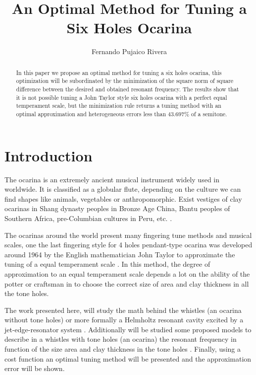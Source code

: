 \documentclass[11pt,twocolumn]{article}
\title{ An Optimal Method for Tuning a Six Holes Ocarina }
\author{Fernando Pujaico Rivera}
\date{ }
\begin{document}
\maketitle


\begin{abstract}
In this paper we propose an optimal method for tuning a six holes ocarina,
this optimization will be subordinated by the minimization of 
the square norm of square difference between the desired and obtained resonant frequency.
The results show that it is not possible tuning a John Taylor style six holes ocarina with a perfect equal temperament scale,
but the minimization rule returns a tuning method with an optimal approximation and heterogeneous errors less than $43.697\%$ of a semitone.
\end{abstract}



\section{Introduction}
The ocarina is an extremely ancient musical instrument widely used in worldwide. 
It is classified as a globular flute,
depending on the culture we can find shapes like animals, vegetables or anthropomorphic.
Exist vestiges of clay ocarinas in 
Shang dynasty peoples in Bronze Age China, 
Bantu peoples of Southern Africa,
pre-Columbian cultures in Peru, etc.
\cite[pp. 589]{apel1969harvard} \cite{sachs1940history} \cite[pp. 31]{leinweber2020art} \cite{rossi2020recuperacion}.

The ocarinas around the world present many fingering tune methods and musical scales,
one the last fingering style for 4 holes pendant-type ocarina was developed around 1964 
by the English mathematician John Taylor 
to approximate the tuning of a equal temperament scale 
\cite[pp. 79]{metropolitan1985american} \cite[pp. 10]{galpin2001newsletter}.
In this method, 
the degree of approximation to an equal temperament scale depends a lot on the ability of the potter or craftsman
in to choose the correct size of area and clay thickness in all the tone holes.

The work presented here, will study the math behind the whistles (an ocarina without tone holes)  
or more formally a Helmholtz resonant cavity \cite{corning2011resonance} excited by a jet-edge-resonator system \cite[pp. 3]{gibiat2013acoustic} \cite[pp. 138]{nyborg1953characteristics}. 
Additionally will be studied some proposed models to describe 
in a whistles with tone holes (an ocarina)
the resonant frequency in function of the size area and  clay thickness in the tone holes 
\cite{mp2010ocarina} \cite[pp. 44]{cabreraestudio} \cite{1999air}.
Finally, using a cost function an optimal tuning method will be presented 
and the approximation error will be shown. 
\end{document}
